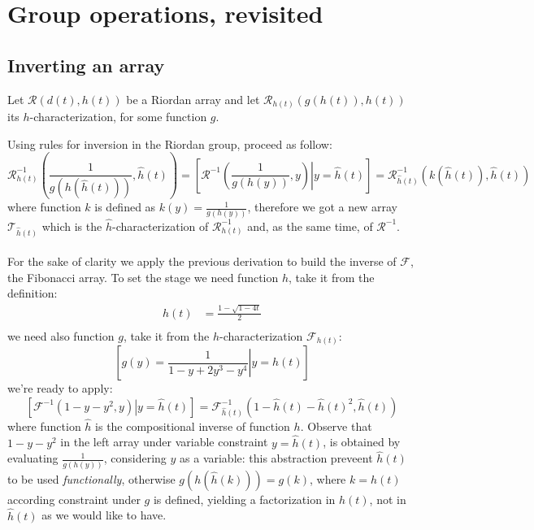 

\section{Group operations, revisited}

\subsection{Inverting an array}

Let $\mathcal{R}\left(d(t),h(t)\right)$ be a Riordan array and let 
$\mathcal{R}_{h(t)}\left(g(h(t)),h(t)\right)$ its $h$-characterization, for some
function $g$. %
 
Using rules for inversion in the Riordan group, 
proceed as follow:
\begin{displaymath}
    \mathcal{R}_{h(t)}^{-1}\left(\frac{1}{g(h(\hat{h}(t)))},\hat{h}(t)\right)=
    \left[\mathcal{R}^{-1}\left(\left.\frac{1}{g(h(y))},y\right) \right| y = \hat{h}(t) \right]=
    \mathcal{R}_{\hat{h}(t)}^{-1}\left(k(\hat{h}(t)),\hat{h}(t)\right)
\end{displaymath}
where function $k$ is defined as $k(y)=\frac{1}{g(h(y))}$, 
therefore we got a new array $\mathcal{T}_{\hat{h}(t)}$ which is the $\hat{h}$-characterization
of $\mathcal{R}_{h(t)}^{-1}$ and, as the same time, of $\mathcal{R}^{-1}$.
\\\\
For the sake of clarity we apply the previous derivation to build the inverse of $\mathcal{F}$,
the Fibonacci array.  To set the stage we need function $h$, take it from the definition:
\begin{displaymath}
    \begin{split}
        h(t)&=\frac{1-\sqrt{1-4t}}{2}\\
    \end{split}
\end{displaymath}
we need also function $g$, take it from the $h$-characterization $\mathcal{F}_{h(t)}$:
\begin{displaymath}
    \left[g(y)=\left.\frac{1}{1-y+2y^3-y^4} \right| y=h(t)\right]
\end{displaymath}
we're ready to apply:
\begin{displaymath}
    \left[\mathcal{F}^{-1}\left.\left(1-y-y^2,y\right) \right| y = \hat{h}(t) \right]=
    \mathcal{F}_{\hat{h}(t)}^{-1}\left(1-\hat{h}(t)-\hat{h}(t)^2,\hat{h}(t)\right)
\end{displaymath}
where function $\hat{h}$ is the compositional inverse of function $h$. Observe that
$1-y-y^2$ in the left array under variable constraint $y=\hat{h}(t)$, is obtained by
evaluating $\frac{1}{g(h(y))}$, considering $y$ as a variable: this abstraction preveent 
$\hat{h}(t)$ to be used \emph{functionally}, otherwise $g(h(\hat{h}(k)))=g(k)$, where $k=h(t)$
according constraint under $g$ is defined, yielding a factorization in $h(t)$, not in $\hat{h}(t)$
as we would like to have.

